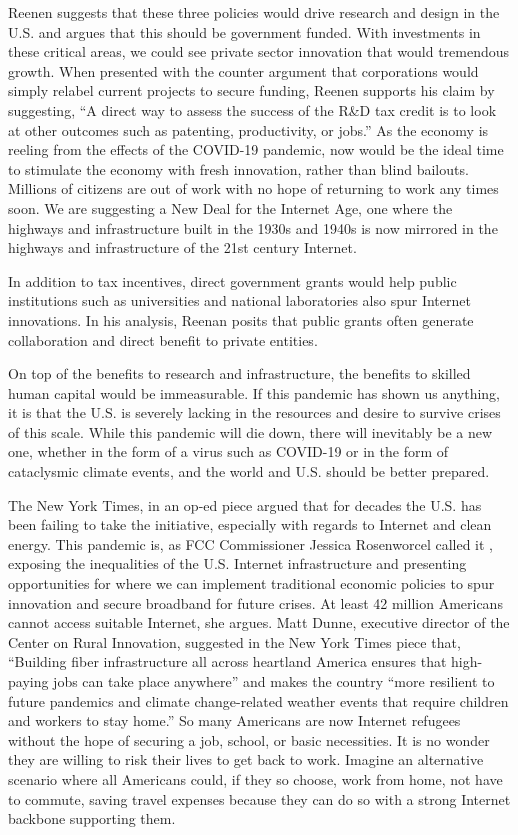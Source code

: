 \documentclass[journal]{IEEEtran}
\begin{document}
Reenen suggests that these three policies would drive research and design in the U.S. and argues that this should be government funded. With investments in these critical areas, we could see private sector innovation that would tremendous growth. When presented with the counter argument that corporations would simply relabel current projects to secure funding, Reenen supports his claim by suggesting, \enquote{A direct way to assess the success of the R\&D tax credit is to look at other outcomes such as patenting, productivity, or jobs.} As the economy is reeling from the effects of the COVID-19 pandemic, now would be the ideal time to stimulate the economy with fresh innovation, rather than blind bailouts. Millions of citizens are out of work with no hope of returning to work any times soon. We are suggesting a New Deal for the Internet Age, one where the highways and infrastructure built in the 1930s and 1940s is now mirrored in the highways and infrastructure of the 21st century Internet.

In addition to tax incentives, direct government grants would help public institutions such as universities and national laboratories also spur Internet innovations. In his analysis, Reenan posits that public grants often generate collaboration and direct benefit to private entities.

On top of the benefits to research and infrastructure, the benefits to skilled human capital would be immeasurable. If this pandemic has shown us anything, it is that the U.S. is severely lacking in the resources and desire to survive crises of this scale. While this pandemic will die down, there will inevitably be a new one, whether in the form of a virus such as COVID-19 or in the form of cataclysmic climate events, and the world and U.S. should be better prepared.

The New York Times, in an op-ed piece argued that for decades the U.S. has been failing to take the initiative, especially with regards to Internet and clean energy. This pandemic is, as FCC Commissioner Jessica Rosenworcel called it \cite{FCC_Dissent}, exposing the inequalities of the U.S. Internet infrastructure and presenting opportunities for where we can implement traditional economic policies to spur innovation and secure broadband for future crises. At least 42 million Americans cannot access suitable Internet, she argues. Matt Dunne, executive director of the Center on Rural Innovation, suggested in the New York Times piece that, \enquote{Building fiber infrastructure all across heartland America ensures that high-paying jobs can take place anywhere} and makes the country \enquote{more resilient to future pandemics and climate change-related weather events that require children and workers to stay home.} So many Americans are now Internet refugees without the hope of securing a job, school, or basic necessities. It is no wonder they are willing to risk their lives to get back to work. Imagine an alternative scenario where all Americans could, if they so choose, work from home, not have to commute, saving travel expenses because they can do so with a strong Internet backbone supporting them.
\end{document}
